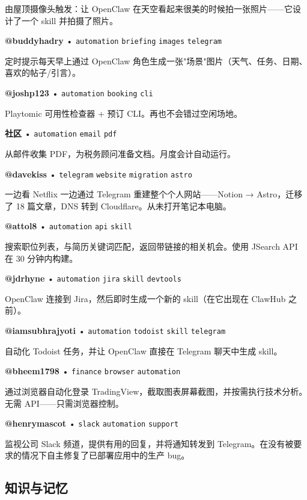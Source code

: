 由屋顶摄像头触发：让 OpenClaw 在天空看起来很美的时候拍一张照片——它设计了一个 skill 并拍摄了照片。


\textbf{@buddyhadry} • \texttt{automation} \texttt{briefing} \texttt{images} \texttt{telegram}

定时提示每天早上通过 OpenClaw 角色生成一张"场景"图片（天气、任务、日期、喜欢的帖子/引言）。

\textbf{@joshp123} • \texttt{automation} \texttt{booking} \texttt{cli}

Playtomic 可用性检查器 + 预订 CLI。再也不会错过空闲场地。


\textbf{社区} • \texttt{automation} \texttt{email} \texttt{pdf}

从邮件收集 PDF，为税务顾问准备文档。月度会计自动运行。

\textbf{@davekiss} • \texttt{telegram} \texttt{website} \texttt{migration} \texttt{astro}

一边看 Netflix 一边通过 Telegram 重建整个个人网站——Notion → Astro，迁移了 18 篇文章，DNS 转到 Cloudflare。从未打开笔记本电脑。

\textbf{@attol8} • \texttt{automation} \texttt{api} \texttt{skill}

搜索职位列表，与简历关键词匹配，返回带链接的相关机会。使用 JSearch API 在 30 分钟内构建。

\textbf{@jdrhyne} • \texttt{automation} \texttt{jira} \texttt{skill} \texttt{devtools}

OpenClaw 连接到 Jira，然后即时生成一个新的 skill（在它出现在 ClawHub 之前）。

\textbf{@iamsubhrajyoti} • \texttt{automation} \texttt{todoist} \texttt{skill} \texttt{telegram}

自动化 Todoist 任务，并让 OpenClaw 直接在 Telegram 聊天中生成 skill。

\textbf{@bheem1798} • \texttt{finance} \texttt{browser} \texttt{automation}

通过浏览器自动化登录 TradingView，截取图表屏幕截图，并按需执行技术分析。无需 API——只需浏览器控制。

\textbf{@henrymascot} • \texttt{slack} \texttt{automation} \texttt{support}

监视公司 Slack 频道，提供有用的回复，并将通知转发到 Telegram。在没有被要求的情况下自主修复了已部署应用中的生产 bug。


\subsection{知识与记忆}



